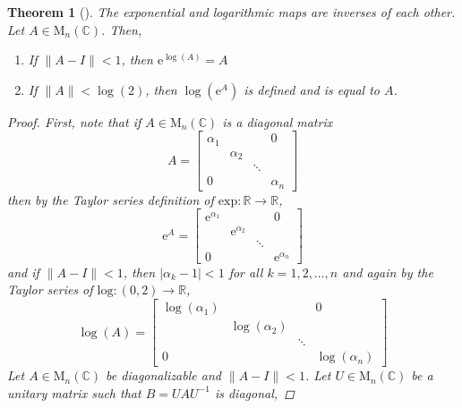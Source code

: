 \documentclass[letterpaper, 10pt]{article}
\theoremstyle{theostyle}
\newtheorem{theorem}{Theorem}[section]
\newenvironment{thmstyle}[1][]{%
    \begin{theorem}[#1]\leavevmode\vspace{-\baselineskip}\myquote%
    }{\endmyquote\end{theorem}}
\begin{document}
\begin{thmstyle}
    The exponential and logarithmic maps are inverses of each other.
    Let \(A \in \mathrm{M}_n (\mathbb{C})\).
    Then,
    \begin{enumerate}
        \item If \(\lVert A - I \rVert < 1\), then \(\mathrm{e}^{\log{(A)}} = A\)
        \item If \(\lVert A \rVert < \log{(2)}\), then \(\log{\left(\mathrm{e}^A\right)}\) is defined and is equal to \(A\).
    \end{enumerate}

    \begin{proof}
        First, note that if \(A \in \mathrm{M}_n (\mathbb{C})\) is a diagonal matrix
        \[A = 
            \begin{bmatrix}
                \alpha_1 & & & 0 \\
                & \alpha_2 & & \\
                & & \ddots & \\
                0 & & & \alpha_n
            \end{bmatrix}
        \]
        then by the Taylor series definition of \(\mathrm{exp} : \mathbb{R} \rightarrow \mathbb{R}\),
        \[\mathrm{e}^{A} = 
            \begin{bmatrix}
                \mathrm{e}^{\alpha_1} & & & 0 \\
                & \mathrm{e}^{\alpha_2} & & \\
                & & \ddots & \\
                0 & & & \mathrm{e}^{\alpha_n}
            \end{bmatrix}
        \]
        and if \(\lVert A - I \rVert < 1\), then \(\lvert \alpha_k - 1\rvert < 1\) for all \(k = 1, 2, \dots, n\) and again by the Taylor series of \(\mathrm{log} : (0,2) \rightarrow \mathbb{R}\),
        \[\log{(A)} = 
            \begin{bmatrix}
                \log{\left(\alpha_1\right)} & & & 0 \\
                & \log{\left(\alpha_2\right)} & & \\
                & & \ddots & \\
                0 & & & \log{\left(\alpha_n\right)}
            \end{bmatrix}
        \]
        Let \(A \in \mathrm{M}_n(\mathbb{C})\) be diagonalizable and \(\lVert A - I \rVert < 1\).
        Let \(U \in \mathrm{M}_n(\mathbb{C})\) be a unitary matrix such that \(B = UAU^{-1}\) is diagonal,

\end{proof}
\end{thmstyle}
\end{document}
